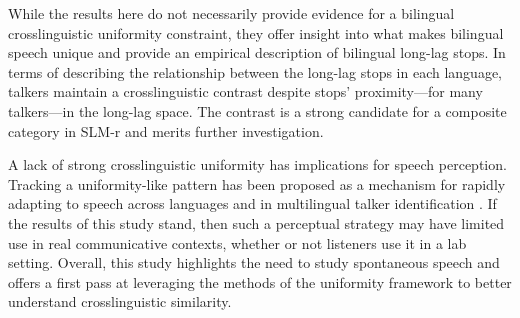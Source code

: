 While the results here do not necessarily provide evidence for a bilingual crosslinguistic uniformity constraint, they offer insight into what makes bilingual speech unique and provide an empirical description of bilingual long-lag stops. In terms of describing the relationship between the long-lag stops in each language, talkers maintain a crosslinguistic contrast despite stops' proximity---for many talkers---in the long-lag space. The contrast is a strong candidate for a composite category in SLM-r \citep{flege_2021_slmr} and merits further investigation.

A lack of strong crosslinguistic uniformity has implications for speech perception. Tracking a uniformity-like pattern has been proposed as a mechanism for rapidly adapting to speech across languages \citep{reinisch_2013_retune} and in multilingual talker identification \cite{orena_2019_identifying}. If the results of this study stand, then such a perceptual strategy may have limited use in real communicative contexts, whether or not listeners use it in a lab setting. Overall, this study highlights the need to study spontaneous speech and offers a first pass at leveraging the methods of the uniformity framework to better understand crosslinguistic similarity.

\endinput %






